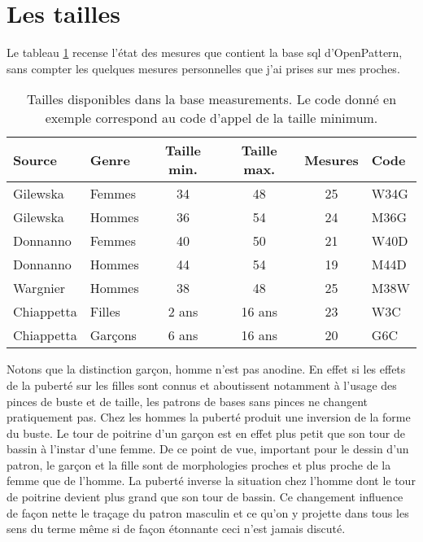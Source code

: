 \documentclass[10pt,a4paper,twoside]{report}
\begin{document}
\section{Les tailles}
\label{par:tailles}
Le tableau \ref{tab:meas_sum} recense l'état des mesures que contient la base sql d'OpenPattern, sans compter les quelques mesures personnelles que j'ai prises sur mes proches.

\begin{table}[htb]
\begin{center}
\begin{tabular}{llcccl} \hline
Source & Genre & Taille min. & Taille max. & Mesures & Code\\ \hline
Gilewska & Femmes & 34 & 48 & 25 &  W34G\\
Gilewska & Hommes & 36 & 54 & 24 & M36G\\
Donnanno & Femmes & 40 & 50 & 21 & W40D\\
Donnanno & Hommes & 44 & 54 & 19 & M44D\\
Wargnier & Hommes & 38 & 48 & 25 & M38W\\
Chiappetta & Filles & 2 ans & 16 ans &23& W3C\\
Chiappetta & Garçons & 6 ans & 16 ans &20& G6C\\ \hline
\end{tabular}
\end{center}
\label{tab:meas_sum}
\caption{Tailles disponibles dans la base measurements. Le code donné en exemple correspond au code d'appel de la taille minimum.}
\end{table}

Notons que la distinction garçon, homme n'est pas anodine. En effet si les effets de la puberté sur les filles sont connus et aboutissent notamment à l'usage  des pinces de buste et de taille, les patrons de bases sans pinces ne changent pratiquement pas. Chez les hommes la puberté produit une inversion de la forme du buste. Le tour de poitrine d'un garçon est en effet plus petit que  son tour de bassin à l'instar d'une femme. De ce point de vue, important pour le dessin d'un patron, le garçon et la fille sont de morphologies proches et plus proche de la femme que de l'homme. La puberté inverse la situation chez l'homme dont le tour de poitrine devient plus grand que son tour de bassin. Ce changement influence de façon nette le traçage du patron masculin et ce qu'on y projette dans tous les sens du terme même si de façon étonnante ceci n'est jamais discuté.
\end{document}
